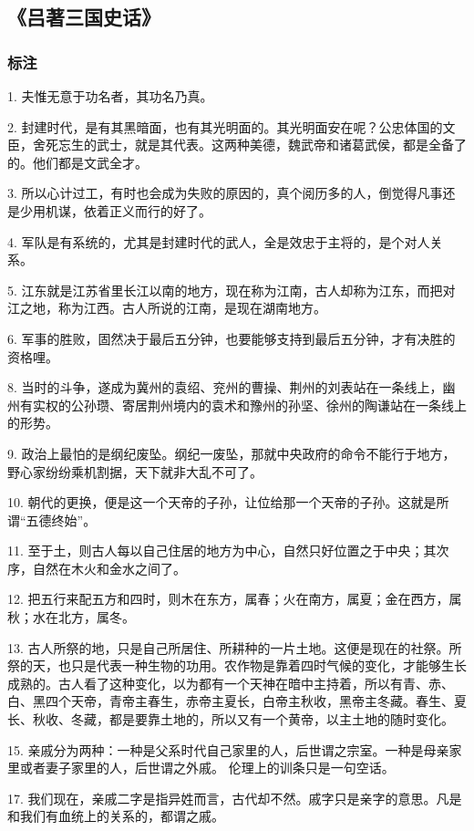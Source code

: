 \subsection{《吕著三国史话》}

\subsubsection{标注}
1. 夫惟无意于功名者，其功名乃真。

2. 封建时代，是有其黑暗面，也有其光明面的。其光明面安在呢？公忠体国的文臣，舍死忘生的武士，就是其代表。这两种美德，魏武帝和诸葛武侯，都是全备了的。他们都是文武全才。

3. 所以心计过工，有时也会成为失败的原因的，真个阅历多的人，倒觉得凡事还是少用机谋，依着正义而行的好了。

4. 军队是有系统的，尤其是封建时代的武人，全是效忠于主将的，是个对人关系。

5. 江东就是江苏省里长江以南的地方，现在称为江南，古人却称为江东，而把对江之地，称为江西。古人所说的江南，是现在湖南地方。

6. 军事的胜败，固然决于最后五分钟，也要能够支持到最后五分钟，才有决胜的资格哩。

8. 当时的斗争，遂成为冀州的袁绍、兖州的曹操、荆州的刘表站在一条线上，幽州有实权的公孙瓒、寄居荆州境内的袁术和豫州的孙坚、徐州的陶谦站在一条线上的形势。

9. 政治上最怕的是纲纪废坠。纲纪一废坠，那就中央政府的命令不能行于地方，野心家纷纷乘机割据，天下就非大乱不可了。

10. 朝代的更换，便是这一个天帝的子孙，让位给那一个天帝的子孙。这就是所谓“五德终始”。

11. 至于土，则古人每以自己住居的地方为中心，自然只好位置之于中央；其次序，自然在木火和金水之间了。

12. 把五行来配五方和四时，则木在东方，属春；火在南方，属夏；金在西方，属秋；水在北方，属冬。

13. 古人所祭的地，只是自己所居住、所耕种的一片土地。这便是现在的社祭。所祭的天，也只是代表一种生物的功用。农作物是靠着四时气候的变化，才能够生长成熟的。古人看了这种变化，以为都有一个天神在暗中主持着，所以有青、赤、白、黑四个天帝，青帝主春生，赤帝主夏长，白帝主秋收，黑帝主冬藏。春生、夏长、秋收、冬藏，都是要靠土地的，所以又有一个黄帝，以主土地的随时变化。

15. 亲戚分为两种：一种是父系时代自己家里的人，后世谓之宗室。一种是母亲家里或者妻子家里的人，后世谓之外戚。 伦理上的训条只是一句空话。

17. 我们现在，亲戚二字是指异姓而言，古代却不然。戚字只是亲字的意思。凡是和我们有血统上的关系的，都谓之戚。

